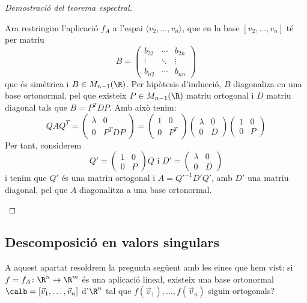\begin{proof}[Demostració del teorema espectral]
\begin{itemize}
    Ara restringim l'aplicació $f_A$ a l'espai $\langle v_2, \dots , v_n\rangle$, que en la base $[v_2, \dots , v_n]$ té per matriu
    \[
    B=\begin{pmatrix} b_{22} & \cdots & b_{2n} \\
    \vdots & \ddots & \vdots \\
    b_{n2} & \cdots  & b_{nn}
    \end{pmatrix}
    \]
    que és simètrica i $B\in M_{n-1}(\R)$. Per hipòtesis d'inducció, $B$ diagonaliza en una base ortonormal, pel que existeix $P\in M_{n-1}(\R)$ matriu ortogonal i $D$ matriu diagonal tals que $B=P^TDP$. Amb això tenim:
    \[
    QAQ^T=\left(\begin{array}{c|c}
        \lambda & 0 \\ \hline
        0 & P^T D P
    \end{array}\right)=
    \left(\begin{array}{c|c}
        1 & 0 \\ \hline
        0 & P^T
    \end{array}\right)
    \left(\begin{array}{c|c}
        \lambda & 0 \\ \hline
        0 & D 
    \end{array}\right)
    \left(\begin{array}{c|c}
        1 & 0 \\ \hline
        0 &  P
    \end{array}\right)
    \]
    Per tant, considerem
    \[
    Q'=\left(\begin{array}{c|c}
        1 & 0 \\ \hline
        0 &  P
    \end{array}\right) Q \text{ i }
    D'=\left(\begin{array}{c|c}
        \lambda & 0 \\ \hline
        0 & D 
    \end{array}\right)
    \]
    i tenim que $Q'$ és una matriu ortogonal i $A=Q'^{-1} D' Q'$, amb $D'$ una matriu diagonal, pel que $A$ diagonalitza a una base ortonormal.
    \end{itemize}
\end{proof}

\subsection{Descomposició en valors singulars}
A aquest apartat resoldrem la pregunta següent amb les eines que hem vist: si $f=f_A\colon \R^n \to \R^m$ és una aplicació lineal, existeix una base ortonormal $\calb=[\vec v_1, \dots, \vec v_n]$ d'$\R^n$ tal que $f(\vec v_1), \dots, f(\vec v_n)$ siguin ortogonals?

